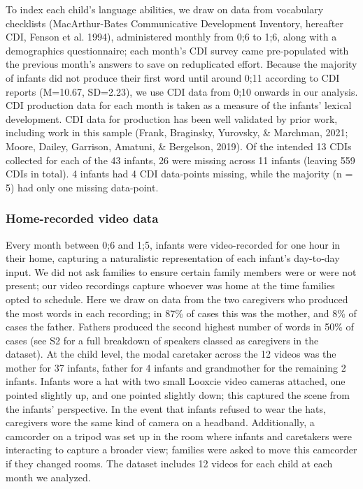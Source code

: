 \documentclass[
  english,
  man,floatsintext]{apa6}
\begin{document}
To index each child's language abilities, we draw on data from vocabulary checklists (MacArthur-Bates Communicative Development Inventory, hereafter CDI, Fenson et al. 1994), administered monthly from 0;6 to 1;6, along with a demographics questionnaire; each month's CDI survey came pre-populated with the previous month's answers to save on reduplicated effort. Because the majority of infants did not produce their first word until around 0;11 according to CDI reports (M=10.67, SD=2.23), we use CDI data from 0;10 onwards in our analysis. CDI production data for each month is taken as a measure of the infants' lexical development. CDI data for production has been well validated by prior work, including work in this sample (Frank, Braginsky, Yurovsky, \& Marchman, 2021; Moore, Dailey, Garrison, Amatuni, \& Bergelson, 2019). Of the intended 13 CDIs collected for each of the 43 infants, 26 were missing across 11 infants (leaving 559 CDIs in total). 4 infants had 4 CDI data-points missing, while the majority (n = 5) had only one missing data-point.

\hypertarget{home-recorded-video-data}{%
\subsubsection{Home-recorded video data}\label{home-recorded-video-data}}

Every month between 0;6 and 1;5, infants were video-recorded for one hour in their home, capturing a naturalistic representation of each infant's day-to-day input. We did not ask families to ensure certain family members were or were not present; our video recordings capture whoever was home at the time families opted to schedule. Here we draw on data from the two caregivers who produced the most words in each recording; in 87\% of cases this was the mother, and 8\% of cases the father. Fathers produced the second highest number of words in 50\% of cases (see S2 for a full breakdown of speakers classed as caregivers in the dataset). At the child level, the modal caretaker across the 12 videos was the mother for 37 infants, father for 4 infants and grandmother for the remaining 2 infants. Infants wore a hat with two small Looxcie video cameras attached, one pointed slightly up, and one pointed slightly down; this captured the scene from the infants' perspective. In the event that infants refused to wear the hats, caregivers wore the same kind of camera on a headband. Additionally, a camcorder on a tripod was set up in the room where infants and caretakers were interacting to capture a broader view; families were asked to move this camcorder if they changed rooms. The dataset includes 12 videos for each child at each month we analyzed.
\end{document}
